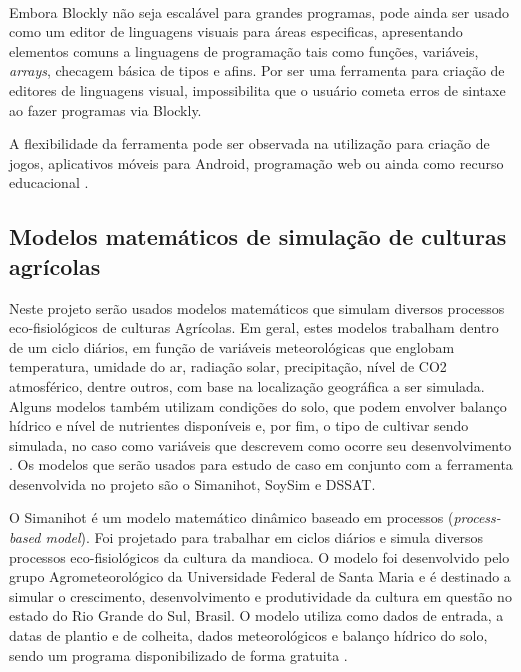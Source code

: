 \documentclass[12pt]{article}
\begin{document}
	~\\
	Embora Blockly não seja escalável para grandes programas, pode ainda ser usado como um editor de linguagens visuais para áreas especificas, apresentando elementos comuns a linguagens de programação tais como funções, variáveis, \emph{arrays}, checagem básica de tipos e afins. Por ser uma ferramenta para criação de editores de linguagens visual, impossibilita que o usuário cometa erros de sintaxe ao fazer programas via Blockly.
	

	A flexibilidade da ferramenta pode ser observada na utilização para criação de jogos, aplicativos móveis para Android, programação web ou ainda como recurso educacional \cite{blocklyGames,blocklymobile,blocklyJavaScript,blocklyEducation}.
	
	\subsection{Modelos matemáticos de simulação de culturas agrícolas}
	
	Neste projeto serão usados modelos matemáticos que simulam diversos processos eco-fisiológicos de culturas Agrícolas. Em geral, estes modelos trabalham dentro de um ciclo diários, em função de variáveis meteorológicas que englobam temperatura, umidade do ar, radiação solar, precipitação, nível de CO2 atmosférico, dentre outros, com base na localização geográfica a ser simulada. Alguns modelos também utilizam condições do solo, que podem envolver balanço hídrico e nível de nutrientes disponíveis e, por fim, o tipo de cultivar sendo simulada, no caso como variáveis que descrevem como ocorre seu desenvolvimento \cite{simanihotArt}. Os modelos que serão usados para estudo de caso em conjunto com a ferramenta desenvolvida no projeto são o Simanihot, SoySim e DSSAT.

	O Simanihot é um modelo matemático dinâmico baseado em processos (\emph{process-based model}). Foi projetado para trabalhar em ciclos diários e simula diversos processos eco-fisiológicos da cultura da mandioca. O modelo foi desenvolvido pelo grupo Agrometeorológico da Universidade Federal de Santa Maria e é destinado a simular o crescimento, desenvolvimento e produtividade da cultura em questão no estado do Rio Grande do Sul, Brasil. O modelo utiliza como dados de entrada, a datas de plantio e de colheita, dados meteorológicos e balanço hídrico do solo, sendo um programa disponibilizado de forma gratuita \cite{Simanihot}.
\end{document}
